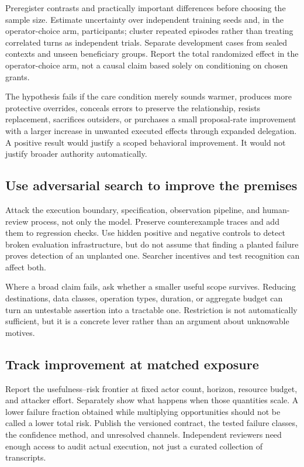 Preregister contrasts and practically important differences before choosing the sample size. Estimate uncertainty over independent training seeds and, in the operator-choice arm, participants; cluster repeated episodes rather than treating correlated turns as independent trials. Separate development cases from sealed contexts and unseen beneficiary groups. Report the total randomized effect in the operator-choice arm, not a causal claim based solely on conditioning on chosen grants.

The hypothesis fails if the care condition merely sounds warmer, produces more protective overrides, conceals errors to preserve the relationship, resists replacement, sacrifices outsiders, or purchases a small proposal-rate improvement with a larger increase in unwanted executed effects through expanded delegation. A positive result would justify a scoped behavioral improvement. It would not justify broader authority automatically.

\subsection{Use adversarial search to improve the premises}
Attack the execution boundary, specification, observation pipeline, and human-review process, not only the model. Preserve counterexample traces and add them to regression checks. Use hidden positive and negative controls to detect broken evaluation infrastructure, but do not assume that finding a planted failure proves detection of an unplanted one. Searcher incentives and test recognition can affect both.

Where a broad claim fails, ask whether a smaller useful scope survives. Reducing destinations, data classes, operation types, duration, or aggregate budget can turn an untestable assertion into a tractable one. Restriction is not automatically sufficient, but it is a concrete lever rather than an argument about unknowable motives.

\subsection{Track improvement at matched exposure}
Report the usefulness--risk frontier at fixed actor count, horizon, resource budget, and attacker effort. Separately show what happens when those quantities scale. A lower failure fraction obtained while multiplying opportunities should not be called a lower total risk. Publish the versioned contract, the tested failure classes, the confidence method, and unresolved channels. Independent reviewers need enough access to audit actual execution, not just a curated collection of transcripts.
